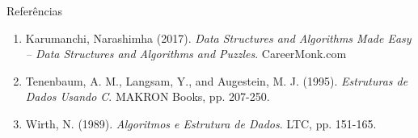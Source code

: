 \begin{frame}{Referências}
	
	\begin{enumerate}
	
		\item Karumanchi, Narashimha (2017). 
		\textit{Data Structures and Algorithms Made Easy -- Data Structures and Algorithms
		and Puzzles}.  CareerMonk.com

		\item Tenenbaum, A. M., Langsam, Y., and Augestein, M. J. (1995). 
		\textit{Estruturas de Dados Usando C}. MAKRON Books, pp. 207-250.

		\item Wirth, N. (1989). \textit{Algoritmos e Estrutura de Dados}. 
		LTC, pp. 151-165.
	
	
	
	\end{enumerate}
	
\end{frame}

